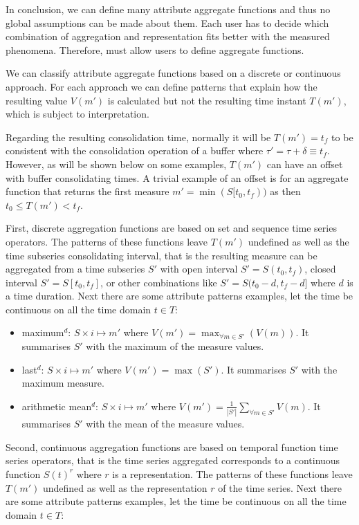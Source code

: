 In conclusion, we can define many attribute aggregate functions and
thus no global assumptions can be made about them. Each user has to
decide which combination of aggregation and representation fits better
with the measured phenomena.  Therefore,  must allow users to
define aggregate functions.

We can classify attribute aggregate functions based on a discrete or
continuous approach. For each approach we can define patterns that
explain how the resulting value $V(m')$ is calculated but not the
resulting time instant $T(m')$, which is subject to
interpretation.  


Regarding the resulting consolidation time, normally it will be
$T(m')=t_f$ to be consistent with the consolidation operation of a
buffer where $\tau' = \tau + \delta \equiv t_f$. However, as will be
shown below on some examples, $T(m')$ can have an offset with buffer
consolidating times. A trivial example of an offset is for an
aggregate function that returns the first measure
$m'=\min(S[t_0,t_f))$ as then $t_0 \leq T(m') < t_f$.


First, discrete aggregation functions are based on set and sequence
time series operators. The patterns of these functions leave $T(m')$
undefined as well as the time subseries consolidating interval, that
is the resulting measure can be aggregated from a time subseries $S'$
with open interval $S'=S(t_0,t_f)$, closed interval $S'=S[t_0,t_f]$,
or other combinations like $S'=S(t_0-d,t_f-d]$ where $d$ is a time
duration. Next there are some attribute patterns examples, let the
time be continuous on all the time domain $t\in T$:
\begin{itemize}
\item maximum$^d$: $S \times i \mapsto m'$ where $V(m') =
  \max_{\forall m \in S'}(V(m))$. It summarises $S'$ with the maximum
  of the measure values.
\item last$^d$: $S \times i \mapsto m'$ where $V(m') = \max(S')$. It
  summarises $S'$ with the maximum measure.
\item arithmetic mean$^d$: $S \times i \mapsto m'$ where $V(m') =
  \frac{1}{|S'|} \sum\limits_{\forall m\in S'} V(m)$. It
  summarises $S'$ with the mean of the measure values.
\end{itemize}


Second, continuous aggregation functions are based on temporal
function time series operators, that is the time series aggregated
corresponds to a continuous function $S(t)^r$ where $r$ is a
representation. The patterns of these functions leave $T(m')$
undefined as well as the representation $r$ of the time series.  Next
there are some attribute patterns examples, let the time be continuous
on all the time domain $t\in T$:

